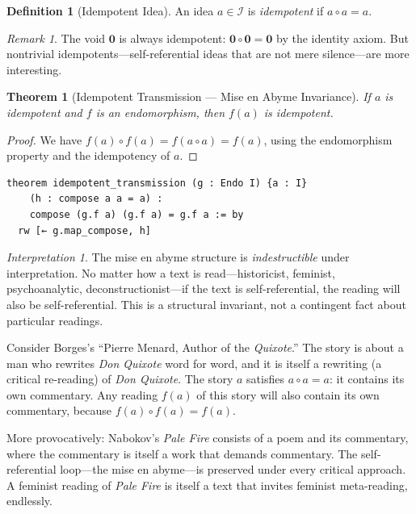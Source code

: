 \documentclass[11pt,openany]{book}
\theoremstyle{definition}
\newtheorem{definition}[axiom]{Definition}
\theoremstyle{plain}
\newtheorem{theorem}[axiom]{Theorem}
\theoremstyle{remark}
\newtheorem{remark}[axiom]{Remark}
\newtheorem{interpretation}[axiom]{Interpretation}
\newcommand{\IS}{\mathcal{I}}               %
\newcommand{\compose}{\circ}                 %
\newcommand{\void}{\mathbf{0}}              %
\begin{document}
\begin{definition}[Idempotent Idea]
An idea $a \in \IS$ is \emph{idempotent} if $a \compose a = a$.
\end{definition}

\begin{remark}
The void $\void$ is always idempotent: $\void \compose \void = \void$ by the identity axiom. But nontrivial idempotents---self-referential ideas that are not mere silence---are more interesting.
\end{remark}

\begin{theorem}[Idempotent Transmission --- Mise en Abyme Invariance]
\label{thm:idempotent-transmission}
If $a$ is idempotent and $f$ is an endomorphism, then $f(a)$ is idempotent.
\end{theorem}

\begin{proof}
We have $f(a) \compose f(a) = f(a \compose a) = f(a)$, using the endomorphism property and the idempotency of $a$.
\end{proof}

\begin{lstlisting}[language=Lean4]
theorem idempotent_transmission (g : Endo I) {a : I}
    (h : compose a a = a) :
    compose (g.f a) (g.f a) = g.f a := by
  rw [← g.map_compose, h]
\end{lstlisting}

\begin{interpretation}
The mise en abyme structure is \emph{indestructible} under interpretation. No matter how a text is read---historicist, feminist, psychoanalytic, deconstructionist---if the text is self-referential, the reading will also be self-referential. This is a structural invariant, not a contingent fact about particular readings.

Consider Borges's ``Pierre Menard, Author of the \textit{Quixote}.'' The story is about a man who rewrites \textit{Don Quixote} word for word, and it is itself a rewriting (a critical re-reading) of \textit{Don Quixote}. The story $a$ satisfies $a \compose a = a$: it contains its own commentary. Any reading $f(a)$ of this story will also contain its own commentary, because $f(a) \compose f(a) = f(a)$.

More provocatively: Nabokov's \textit{Pale Fire} consists of a poem and its commentary, where the commentary is itself a work that demands commentary. The self-referential loop---the mise en abyme---is preserved under every critical approach. A feminist reading of \textit{Pale Fire} is itself a text that invites feminist meta-reading, endlessly.
\end{interpretation}
\end{document}
